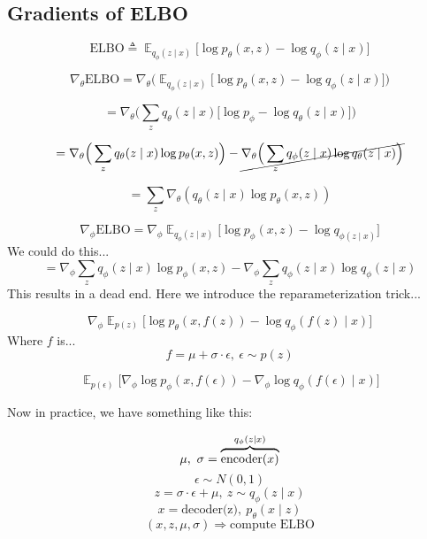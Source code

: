 \documentclass{article}
\begin{document}
\subsection*{Gradients of ELBO}

\[ 
    \text{ELBO} \triangleq \mathop{\mathbb{E}}_{q_{\phi}(z \mid x)} \Big[ \log p_{\theta}(x, z) - \log q_{\phi}(z \mid x) \Big]
\]

\[
    \nabla_{\theta} \text{ELBO} =
    \nabla_{\theta} \Big(
        \mathop{\mathbb{E}}_{q_{\phi}(z \mid x)}
        \Big[
            \log p_{\theta}(x, z) - \log q_{\phi}(z \mid x)
        \Big]
    \Big)
\]

\[
    = \nabla_{\theta} \Big(
        \sum_{z} q_{\theta} (z \mid x) \Big[
            \log p_{\phi} - \log q_{\theta}(z \mid x)
        \Big]
    \Big)
\]

\[
     = \nabla_{\theta} \Big(
        \sum_{z} q_{\theta}(z \mid x) \log p_{\theta}(x, z)
     \Big)
     - \cancel{\nabla_{\theta} \Big(
        \sum_{z} q_{\phi}(z \mid x) \log q_{\theta}(z \mid x)
     \Big)}
\]

\[
    = \sum_{z} \nabla_{\theta}(q_{\theta}(z \mid x) \log p_{\theta}(x, z))
\]

\[
    \nabla_{\phi}\text{ELBO} = \nabla_{\phi} \mathop{\mathbb{E}}_{q_{\phi}(z \mid x)} \Big[
        \log p_{\phi}(x, z) - \log q_{\phi(z \mid x)}
    \Big]
\]
We could do this...
\[
= \nabla_{\phi} \sum_{z} q_{\phi}(z \mid x) \log p_{\phi} (x, z) - \nabla_{\phi} \sum_{z} q_{\phi}(z \mid x) \log q_{\phi}(z \mid x)
\]
This results in a dead end.
Here we introduce the reparameterization trick...

\[
\nabla_{\phi} \mathop{\mathbb{E}}_{p(z)} \Big[
    \log p_{\theta}(x, f(z)) - \log q_{\phi} (f(z) \mid x)
\Big]
\]
Where $f$ is...
\[
    f = \mu + \sigma \cdot \epsilon,\ \epsilon \sim	p(z)
\]

\[
\mathop{\mathbb{E}}_{p(\epsilon)} \Big[
    \nabla_{\phi} \log p_{\phi}(x, f(\epsilon)) - \nabla_{\phi} \log q_{\phi} (f(\epsilon) \mid x)
\Big]
\]

\noindent Now in practice, we have something like this:

\[
\mu,\ \sigma = \overbrace{\text{encoder}(x)}^{\mathclap{q_{\phi}(z \mid x)}}
\]
\[
\epsilon \sim N(0, 1)
\]
\[
z = \sigma \cdot \epsilon + \mu,\ z \sim q_{\phi}(z \mid x)
\]
\[
x = \text{decoder(z)},\ p_{\theta}(x \mid z)
\]
\[
(x, z, \mu, \sigma) \Rightarrow \text{compute ELBO}
\]
\end{document}
